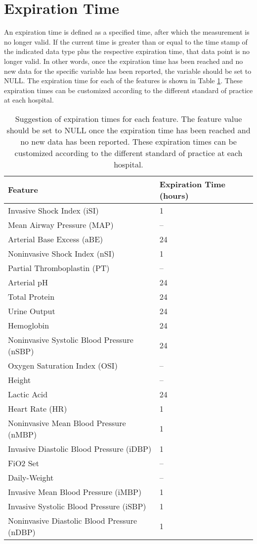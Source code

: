 \documentclass[
   technote
]{phildoc}
\newcommand{\tab}{Table}
\begin{document}
\section{Expiration Time}
An expiration time is defined as a specified time, after which the measurement is no longer valid. If the current time is greater than or equal to the time stamp of the indicated data type plus the respective expiration time, that data point is no longer valid.  In other words, once the expiration time has been reached and no new data for the specific variable has been reported, the variable should be set to NULL. The expiration time for each of the features is shown in \tab{} \ref{tab:expiration_time}. These expiration times can be customized according to the different standard of practice at each hospital.

\begin{table}[h!]
\center
\caption{Suggestion of expiration times for each feature. The feature value should be set to NULL once the expiration time has been reached and no new data has been reported. These expiration times can be customized according to the different standard of practice at each hospital.}
\label{tab:expiration_time}
\begin{tabular}{|l|l|}
	\hline
	\textbf{Feature} & \textbf{Expiration Time (hours)} \\
	\hline
	\hline
	Invasive Shock Index (iSI) & 1 \\
	\hline
	Mean Airway Pressure (MAP) & --\\
	\hline
	Arterial Base Excess (aBE) & 24 \\
	\hline
	Noninvasive Shock Index (nSI) & 1\\
	\hline
	Partial Thromboplastin (PT) & -- \\
	\hline
	Arterial pH & 24 \\
	\hline
	Total Protein & 24 \\
	\hline
	Urine Output & 24 \\
	\hline
	Hemoglobin & 24 \\
	\hline
	Noninvasive Systolic Blood Pressure (nSBP) & 24 \\
	\hline
	Oxygen Saturation Index (OSI) & -- \\
	\hline
	Height & -- \\
	\hline
	Lactic Acid & 24 \\
	\hline
	Heart Rate (HR) & 1 \\
	\hline
	Noninvasive Mean Blood Pressure (nMBP) & 1 \\
	\hline
	Invasive Diastolic Blood Pressure (iDBP) & 1 \\
	\hline
	FiO2 Set & -- \\
	\hline
	Daily-Weight & -- \\
	\hline
	Invasive Mean Blood Pressure (iMBP) & 1 \\
	\hline
	Invasive Systolic Blood Pressure (iSBP) & 1  \\
	\hline
	Noninvasive Diastolic Blood Pressure (nDBP) & 1 \\
	\hline
\end{tabular}
\end{table}
 
\end{document}
